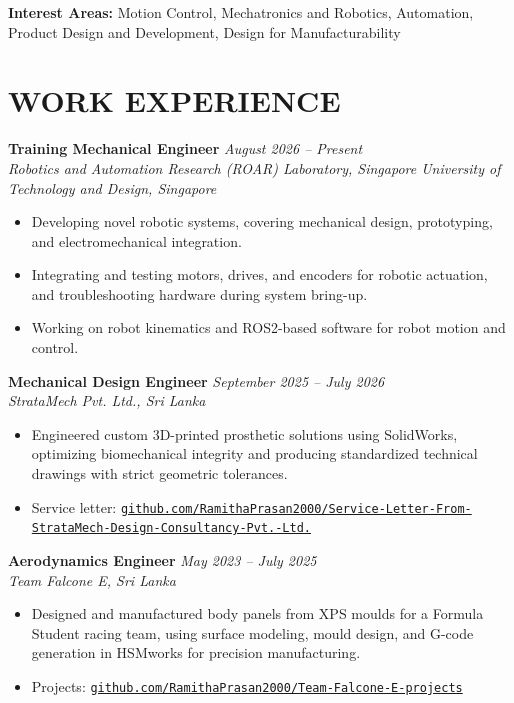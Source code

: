 \documentclass[10pt,a4paper]{article}
\newcommand{\role}[3]{%
    \textbf{#1} \hfill {\itshape\color{dategray}#2}\\
    \textit{#3}\\[-2pt]
}
\begin{document}
\textbf{Interest Areas:} Motion Control, Mechatronics and Robotics, Automation, Product Design and Development, Design for Manufacturability

\section{WORK EXPERIENCE}

\role{Training Mechanical Engineer}{August 2026 -- Present}{Robotics and Automation Research (ROAR) Laboratory, Singapore University of Technology and Design, Singapore}
\vspace{-10pt}
\begin{itemize}[leftmargin=18pt, itemsep=3pt, topsep=0pt, partopsep=0pt, parsep=0pt]
    \item Developing novel robotic systems, covering mechanical design, prototyping, and electromechanical integration.
    \item Integrating and testing motors, drives, and encoders for robotic actuation, and troubleshooting hardware during system bring-up.
    \item Working on robot kinematics and ROS2-based software for robot motion and control.
\end{itemize}
\vspace{9pt}

\role{Mechanical Design Engineer}{September 2025 -- July 2026}{StrataMech Pvt. Ltd., Sri Lanka}
\vspace{-10pt}
\begin{itemize}[leftmargin=18pt, itemsep=3pt, topsep=0pt, partopsep=0pt, parsep=0pt]
    \item Engineered custom 3D-printed prosthetic solutions using SolidWorks, optimizing biomechanical integrity and producing standardized technical drawings with strict geometric tolerances.
    \item Service letter: \href{https://github.com/RamithaPrasan2000/Service-Letter-From-StrataMech-Design-Consultancy-Pvt.-Ltd.}{\nolinkurl{github.com/RamithaPrasan2000/Service-Letter-From-StrataMech-Design-Consultancy-Pvt.-Ltd.}}
\end{itemize}
\vspace{9pt}

\role{Aerodynamics Engineer}{May 2023 -- July 2025}{Team Falcone E, Sri Lanka}
\vspace{-10pt}
\begin{itemize}[leftmargin=18pt, itemsep=3pt, topsep=0pt, partopsep=0pt, parsep=0pt]
    \item Designed and manufactured body panels from XPS moulds for a Formula Student racing team, using surface modeling, mould design, and G-code generation in HSMworks for precision manufacturing.
    \item Projects: \href{https://github.com/RamithaPrasan2000/Team-Falcone-E-projects.git}{\nolinkurl{github.com/RamithaPrasan2000/Team-Falcone-E-projects}}
\end{itemize}
\vspace{9pt}
\end{document}
